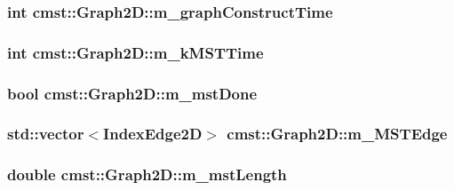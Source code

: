\subsubsection[{\texorpdfstring{m\_graphConstructTime}{m_graphConstructTime}}]{\setlength{\rightskip}{0pt plus 5cm}int cmst::Graph2D::m\_graphConstructTime\hspace{0.3cm}{\ttfamily [private]}}\hypertarget{classcmst_1_1_graph2_d_ac594da90a2c9bd7332644532969ef11f}{}\label{classcmst_1_1_graph2_d_ac594da90a2c9bd7332644532969ef11f}
\subsubsection[{\texorpdfstring{m\_kMSTTime}{m_kMSTTime}}]{\setlength{\rightskip}{0pt plus 5cm}int cmst::Graph2D::m\_kMSTTime\hspace{0.3cm}{\ttfamily [private]}}\hypertarget{classcmst_1_1_graph2_d_a647ad467e7c301503a9ed46fd0eab494}{}\label{classcmst_1_1_graph2_d_a647ad467e7c301503a9ed46fd0eab494}
\subsubsection[{\texorpdfstring{m\_mstDone}{m_mstDone}}]{\setlength{\rightskip}{0pt plus 5cm}bool cmst::Graph2D::m\_mstDone\hspace{0.3cm}{\ttfamily [private]}}\hypertarget{classcmst_1_1_graph2_d_ab7c087fe87b5750195100ff25f10f628}{}\label{classcmst_1_1_graph2_d_ab7c087fe87b5750195100ff25f10f628}
\subsubsection[{\texorpdfstring{m\_MSTEdge}{m_MSTEdge}}]{\setlength{\rightskip}{0pt plus 5cm}std::vector$<${\bf IndexEdge2D}$>$ cmst::Graph2D::m\_MSTEdge\hspace{0.3cm}{\ttfamily [protected]}}\hypertarget{classcmst_1_1_graph2_d_a1cc96b5251162964ac21f46955ac8271}{}\label{classcmst_1_1_graph2_d_a1cc96b5251162964ac21f46955ac8271}
\subsubsection[{\texorpdfstring{m\_mstLength}{m_mstLength}}]{\setlength{\rightskip}{0pt plus 5cm}double cmst::Graph2D::m\_mstLength\hspace{0.3cm}{\ttfamily [private]}}\hypertarget{classcmst_1_1_graph2_d_a722498b25b96d26e68e378ba970d5e65}{}\label{classcmst_1_1_graph2_d_a722498b25b96d26e68e378ba970d5e65}

